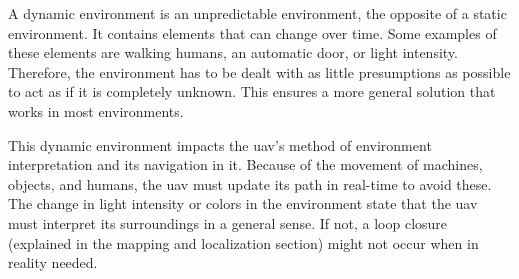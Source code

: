 A dynamic environment is an unpredictable environment, the opposite of a static environment. It contains elements that can change over time. Some examples of these elements are walking humans, an automatic door, or light intensity. Therefore, the environment has to be dealt with as little presumptions as possible to act as if it is completely unknown. This ensures a more general solution that works in most environments.

This dynamic environment impacts the \acs{uav}'s method of environment interpretation and its navigation in it. Because of the movement of machines, objects, and humans, the \acs{uav} must update its path in real\hyp{}time to avoid these. The change in light intensity or colors in the environment state that the \acs{uav} must interpret its surroundings in a general sense. If not, a loop closure (explained in the mapping and localization section) might not occur when in reality needed.